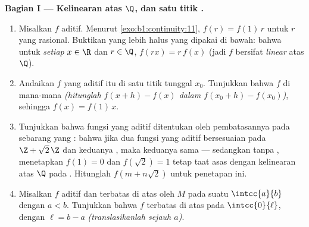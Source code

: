 \begin{problem}[{Soal akhir pekan --- $f(x + y) = f(x) + f(y)$:
keteraturan memaksa kelinearan, beserta potret monsternya}]
\medskip
\noindent\textbf{Bagian I --- Kelinearan atas $\Q$, dan satu titik
.}
\begin{enumerate}
  \item Misalkan $f$ aditif. Menurut \cref{exo:b1:continuity:11},
        $f(r) = f(1)\,r$ untuk $r$ yang rasional. Buktikan 
        yang lebih halus yang dipakai di bawah: bahwa untuk \emph{setiap} $x \in \R$ dan $r
        \in \Q$, $f(rx) = r\,f(x)$ (jadi $f$ bersifat
        \emph{linear} atas $\Q$).
  \item Andaikan $f$ yang aditif itu  di satu titik
        tunggal $x_0$. Tunjukkan bahwa $f$  di mana-mana
        \emph{(hitunglah $f(x + h) - f(x)$ dalam $f(x_0 + h)
        - f(x_0)$)}, sehingga $f(x) = f(1)\,x$.
  \item Tunjukkan bahwa fungsi yang aditif ditentukan oleh
        pembatasannya pada sebarang  yang : bahwa jika dua fungsi
        yang aditif bersesuaian pada $\Z + \sqrt2\,\Z$ dan keduanya
        , maka keduanya sama --- sedangkan tanpa ,
        menetapkan $f(1) = 0$ dan $f(\sqrt 2) = 1$ tetap taat asas
        dengan kelinearan atas $\Q$ pada . Hitunglah $f(m +
        n\sqrt2)$ untuk penetapan ini.
  \item Misalkan $f$ aditif dan terbatas di atas oleh $M$ pada suatu
         $\intcc{a}{b}$ dengan $a < b$. Tunjukkan bahwa $f$
        terbatas di atas pada $\intcc{0}{\ell}$, dengan $\ell = b - a$
        \emph{(translasikanlah sejauh $a$)}.
\end{enumerate}


\end{problem}
